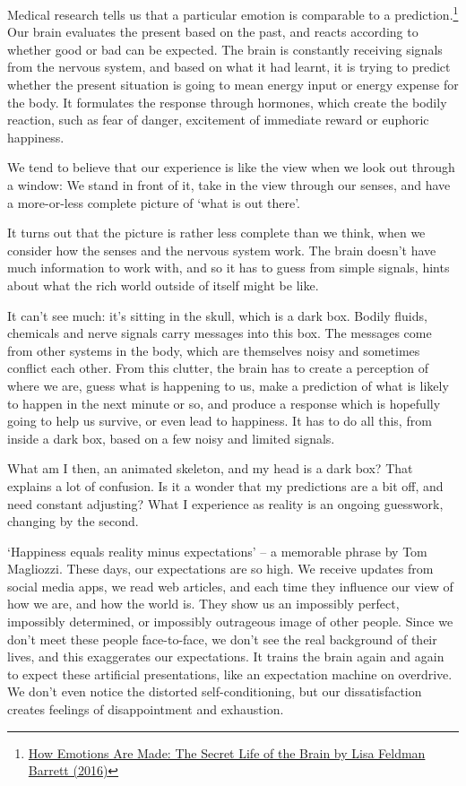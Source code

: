 
Medical research tells us that a particular emotion is comparable to a
prediction.\footnote{\href{https://www.goodreads.com/book/show/23719305-how-emotions-are-made}{How
  Emotions Are Made: The Secret Life of the Brain by Lisa Feldman
  Barrett (2016)}} Our brain evaluates the present based on the past,
and reacts according to whether good or bad can be expected. The brain
is constantly receiving signals from the nervous system, and based on
what it had learnt, it is trying to predict whether the present
situation is going to mean energy input or energy expense for the body.
It formulates the response through hormones, which create the bodily
reaction, such as fear of danger, excitement of immediate reward or
euphoric happiness.

We tend to believe that our experience is like the view when we look out
through a window: We stand in front of it, take in the view through our
senses, and have a more-or-less complete picture of `what is out there'.

It turns out that the picture is rather less complete than we think,
when we consider how the senses and the nervous system work. The brain
doesn't have much information to work with, and so it has to guess from
simple signals, hints about what the rich world outside of itself might
be like.

It can't see much: it's sitting in the skull, which is a dark box.
Bodily fluids, chemicals and nerve signals carry messages into this box.
The messages come from other systems in the body, which are themselves
noisy and sometimes conflict each other. From this clutter, the brain
has to create a perception of where we are, guess what is happening to
us, make a prediction of what is likely to happen in the next minute or
so, and produce a response which is hopefully going to help us survive,
or even lead to happiness. It has to do all this, from inside a dark
box, based on a few noisy and limited signals.

What am I then, an animated skeleton, and my head is a dark box? That
explains a lot of confusion. Is it a wonder that my predictions are a
bit off, and need constant adjusting? What I experience as reality is an
ongoing guesswork, changing by the second.

`Happiness equals reality minus expectations' -- a memorable phrase by
Tom Magliozzi. These days, our expectations are so high. We receive
updates from social media apps, we read web articles, and each time they
influence our view of how we are, and how the world is. They show us an
impossibly perfect, impossibly determined, or impossibly outrageous
image of other people. Since we don't meet these people face-to-face, we
don't see the real background of their lives, and this exaggerates our
expectations. It trains the brain again and again to expect these
artificial presentations, like an expectation machine on overdrive. We
don't even notice the distorted self-conditioning, but our
dissatisfaction creates feelings of disappointment and exhaustion.

